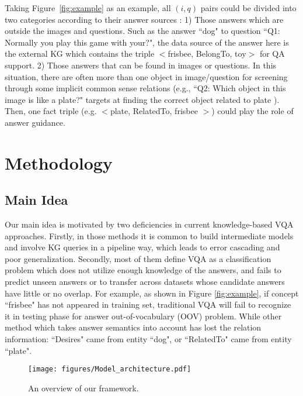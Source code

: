 \documentclass[runningheads]{llncs}
\begin{document}
Taking  Figure~\ref{fig:example} as an example, all $(i,q)$ pairs could be divided into two categories according to their answer sources :
1) Those answers which are outside the images and questions. Such as the answer ``dog" to question ``Q1: Normally you play this game with your?", the data source of the answer here is the external KG which contains the triple $<$frisbee, BelongTo, toy$>$ for QA support.
2) Those answers that can be found in images or questions. In this situation, there are often more than one object in image/question for screening through some implicit common sense relations (e.g., ``Q2: Which object in this image is like a plate?" targets at finding the correct object related to plate ). Then, one fact triple (e.g. $<$plate, RelatedTo, frisbee $>$) could play the role of answer guidance.

\section{Methodology}
\subsection{Main Idea}
Our main idea is motivated by two deficiencies in current knowledge-based VQA approaches. Firstly, in those methods it is common to build intermediate models and involve KG queries in a pipeline way, which leads to error cascading and poor generalization.
Secondly, most of them define VQA as a classification problem which does not utilize enough knowledge of the answers, and fails to predict unseen answers or to transfer across datasets whose candidate answers have little or no overlap.
For example, as shown in Figure \ref{fig:example}, if concept ``frisbee" has not appeared in training set, traditional VQA will fail to recognize it in testing phase for answer out-of-vocabulary (OOV) problem. While other method \cite{DBLP:conf/cvpr/HuCS18} which takes answer semantics into account has lost the relation information: ``Desires" came from entity ``dog", or ``RelatedTo" came from entity ``plate".
\begin{figure}[htbp]
\centering
\texttt{[image: figures/Model\_architecture.pdf]} 
\caption{ An overview of our framework.
}
\label{fig:Model_architecture}
\end{figure}
\end{document}

